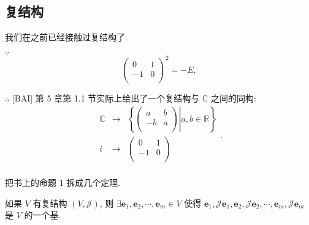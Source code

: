 \documentclass{ctexart}
\begin{document}
\subsection{复结构}
我们在之前已经接触过复结构了.
\begin{example}
    $\because$
    \[\begin{pmatrix}
        0 & 1 \\
        -1 & 0 \\
    \end{pmatrix}^2=-E,\]

    $\therefore$ [BAI] 第 5 章第 1.1 节实际上给出了一个复结构与 $\mathbb{C}$ 之间的同构:
    \[\begin{array}{rcl}
        \mathbb{C} & \to & \left\{\left.\begin{pmatrix}
            a & b \\
            -b & a \\
        \end{pmatrix}\right|a,b\in\mathbb{R}\right\} \\
        i & \to & \begin{pmatrix}
            0 & 1 \\
            -1 & 0 \\
        \end{pmatrix} \\
    \end{array}.\]
\end{example}
把书上的命题 1 拆成几个定理.
\begin{theorem}\label{t4.1}
    如果 $V$ 有复结构 $(V,\mathcal{J})$, 则 $\exists\boldsymbol{e}_1,\boldsymbol{e}_2,\cdots,\boldsymbol{e}_m\in V$ 使得 $\boldsymbol{e}_1,\mathcal{J}\boldsymbol{e}_1,\boldsymbol{e}_2,\mathcal{J}\boldsymbol{e}_2,\cdots,\boldsymbol{e}_m,\mathcal{J}\boldsymbol{e}_m$ 是 $V$ 的一个基.
\end{theorem}
\end{document}

